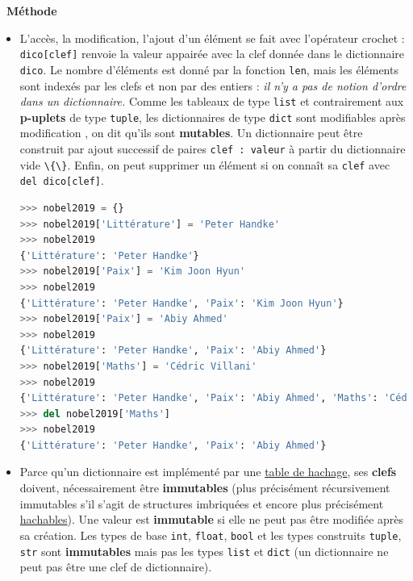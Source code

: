 \documentclass[
  11pt,
]{article}
\newcommand{\passthrough}[1]{#1}
\newenvironment{methode}[1]
{\par \medskip    \noindent  
 \begin {bclogo}[arrondi =0.1,logo=\bcoutil, marge=4,noborder = true] {~\textbf{Méthode}   {\itshape #1} }  \par}
{
\end{bclogo}
 \par \bigskip }
\begin{document}
\begin{methode}{}

\begin{itemize}
\item
  L'accès, la modification, l'ajout d'un élément se fait avec
  l'opérateur crochet : \passthrough{\lstinline!dico[clef]!} renvoie la
  valeur appairée avec la clef donnée dans le dictionnaire
  \passthrough{\lstinline!dico!}. Le nombre d'éléments est donné par la
  fonction \passthrough{\lstinline!len!}, mais les éléments sont indexés
  par les clefs et non par des entiers : \emph{il n'y a pas de notion
  d'ordre dans un dictionnaire.} Comme les tableaux de type
  \passthrough{\lstinline!list!} et contrairement aux \textbf{p-uplets}
  de type \passthrough{\lstinline!tuple!}, les dictionnaires de type
  \passthrough{\lstinline!dict!} sont modifiables après modification ,
  on dit qu'ils sont \textbf{mutables}. Un dictionnaire peut être
  construit par ajout successif de paires
  \passthrough{\lstinline!clef : valeur!} à partir du dictionnaire vide
  \passthrough{\lstinline!\{\}!}. Enfin, on peut supprimer un élément si
  on connaît sa \passthrough{\lstinline!clef!} avec
  \passthrough{\lstinline!del dico[clef]!}.

\begin{lstlisting}[language=Python]
>>> nobel2019 = {}
>>> nobel2019['Littérature'] = 'Peter Handke'
>>> nobel2019
{'Littérature': 'Peter Handke'}
>>> nobel2019['Paix'] = 'Kim Joon Hyun'
>>> nobel2019
{'Littérature': 'Peter Handke', 'Paix': 'Kim Joon Hyun'}
>>> nobel2019['Paix'] = 'Abiy Ahmed'
>>> nobel2019
{'Littérature': 'Peter Handke', 'Paix': 'Abiy Ahmed'}
>>> nobel2019['Maths'] = 'Cédric Villani'
>>> nobel2019
{'Littérature': 'Peter Handke', 'Paix': 'Abiy Ahmed', 'Maths': 'Cédric Villani'}
>>> del nobel2019['Maths']
>>> nobel2019
{'Littérature': 'Peter Handke', 'Paix': 'Abiy Ahmed'}
\end{lstlisting}
\item
  Parce qu'un dictionnaire est implémenté par une
  \href{https://fr.wikipedia.org/wiki/Table_de_hachage}{table de
  hachage}, ses \textbf{clefs} doivent, nécessairement être
  \textbf{immutables} (plus précisément récursivement immutables s'il
  s'agit de structures imbriquées et encore plus précisément
  \href{https://docs.python.org/3/glossary.html}{hachables}). Une valeur
  est \textbf{immutable} si elle ne peut pas être modifiée après sa
  création. Les types de base \passthrough{\lstinline!int!},
  \passthrough{\lstinline!float!}, \passthrough{\lstinline!bool!} et les
  types construits \passthrough{\lstinline!tuple!},
  \passthrough{\lstinline!str!} sont \textbf{immutables} mais pas les
  types \passthrough{\lstinline!list!} et \passthrough{\lstinline!dict!}
  (un dictionnaire ne peut pas être une clef de dictionnaire).


\end{itemize}
\end{methode}
\end{document}
